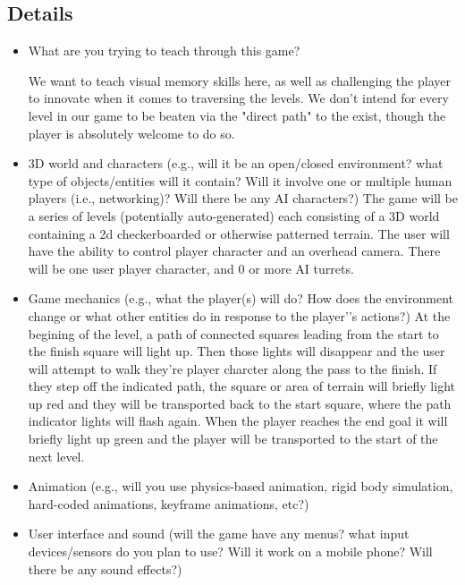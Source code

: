 \documentclass[11pt]{article}
\begin{document}
\subsection{Details}
\begin{itemize}
\item What are you trying to teach through this game?

We want to teach visual memory skills here, as well as challenging the player to innovate when it comes to traversing the levels. We don't intend for every level in our game to be beaten via the "direct path" to the exist, though the player is absolutely welcome to do so.

\item 3D world and characters (e.g., will it be an open/closed environment? what type of objects/entities will it contain? Will it involve one or multiple human players (i.e., networking)? Will there be any AI characters?)
The game will be a series of levels (potentially auto-generated) each consisting of a 3D world containing a 2d checkerboarded or otherwise patterned terrain. The user will have the ability to control player character and an overhead camera. There will be one user player character, and 0 or more AI turrets. 

\item Game mechanics (e.g., what the player(s) will do? How does the environment change or what other entities do in response to the player’'s actions?)
At the begining of the level, a path of connected squares leading from the start to the finish square will light up. Then those lights will disappear and the user will attempt to walk they're player charcter along the pass to the finish. If they step off the indicated path, the square or area of terrain will briefly light up red and they will be transported back to the start square, where the path indicator lights will flash again. When the player reaches the end goal it will briefly light up green and the player will be transported to the start of the next level.  

\item Animation (e.g., will you use physics-based animation, rigid body simulation, hard-coded animations, keyframe animations, etc?)


\item User interface and sound (will the game have any menus? what input devices/sensors do you plan to use? Will it work on a mobile phone? Will there be any sound effects?)
\end{itemize}
\end{document}

